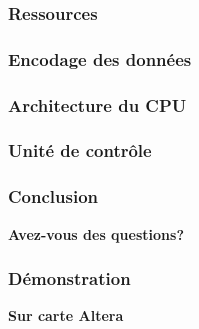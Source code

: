 \documentclass{beamer}
\begin{document}
\begin{frame}
\frametitle{Ressources} %
\end{frame}

\begin{frame}
\frametitle{Encodage des données} %
\end{frame}

\begin{frame}
\frametitle{Architecture du CPU}
\end{frame}

\begin{frame}
\frametitle{Unité de contrôle}
\end{frame}

\begin{frame}
\frametitle{Conclusion}
\end{frame}

\begin{frame}
\begin{center}
	{\Large \textbf{Avez-vous des questions?}}
\end{center}
\end{frame}

\begin{frame}
\frametitle{Démonstration}
\begin{center}
	{\Large \textbf{Sur carte Altera}}
\end{center}
\end{frame}

\end{document}
